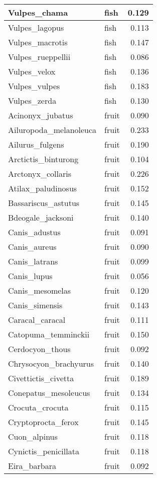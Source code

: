 \begin{table}
\begin{tabular}[t]{l|l|r}
\hline
Vulpes\_chama & fish & 0.129\\
\hline
Vulpes\_lagopus & fish & 0.113\\
\hline
Vulpes\_macrotis & fish & 0.147\\
\hline
Vulpes\_rueppellii & fish & 0.086\\
\hline
Vulpes\_velox & fish & 0.136\\
\hline
Vulpes\_vulpes & fish & 0.183\\
\hline
Vulpes\_zerda & fish & 0.130\\
\hline
Acinonyx\_jubatus & fruit & 0.090\\
\hline
Ailuropoda\_melanoleuca & fruit & 0.233\\
\hline
Ailurus\_fulgens & fruit & 0.190\\
\hline
Arctictis\_binturong & fruit & 0.104\\
\hline
Arctonyx\_collaris & fruit & 0.226\\
\hline
Atilax\_paludinosus & fruit & 0.152\\
\hline
Bassariscus\_astutus & fruit & 0.145\\
\hline
Bdeogale\_jacksoni & fruit & 0.140\\
\hline
Canis\_adustus & fruit & 0.091\\
\hline
Canis\_aureus & fruit & 0.090\\
\hline
Canis\_latrans & fruit & 0.099\\
\hline
Canis\_lupus & fruit & 0.056\\
\hline
Canis\_mesomelas & fruit & 0.120\\
\hline
Canis\_simensis & fruit & 0.143\\
\hline
Caracal\_caracal & fruit & 0.111\\
\hline
Catopuma\_temminckii & fruit & 0.150\\
\hline
Cerdocyon\_thous & fruit & 0.092\\
\hline
Chrysocyon\_brachyurus & fruit & 0.140\\
\hline
Civettictis\_civetta & fruit & 0.189\\
\hline
Conepatus\_mesoleucus & fruit & 0.134\\
\hline
Crocuta\_crocuta & fruit & 0.115\\
\hline
Cryptoprocta\_ferox & fruit & 0.145\\
\hline
Cuon\_alpinus & fruit & 0.118\\
\hline
Cynictis\_penicillata & fruit & 0.118\\
\hline
Eira\_barbara & fruit & 0.092\\

\end{tabular}
\end{table}
